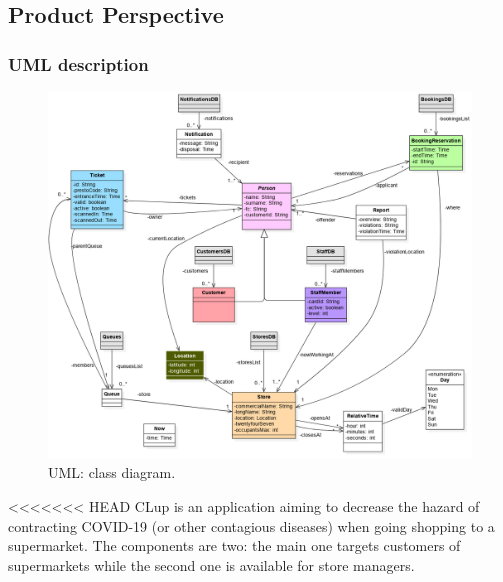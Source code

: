 \sffamily

\subsection{Product Perspective}

\subsubsection{UML description}
\begin{figure} [H]
	\includegraphics[width=\linewidth]{../Diagrams/main_class_diagram.png}
	\caption{UML: class diagram.}
	\label{fig:UML}
\end{figure}
<<<<<<< HEAD
CLup is an application aiming to decrease the hazard of contracting COVID-19 (or other contagious diseases) when going shopping to a supermarket. The components are two: the main one targets customers of supermarkets while the second one is available for store managers.\newline
